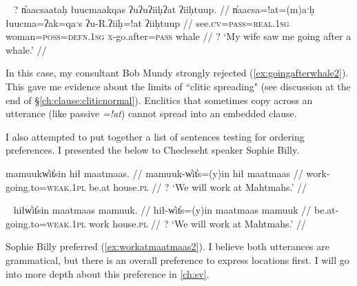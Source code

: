 \ex~ \label{ex:goingafterwhale2}
\begingl
\glpreamble ? n̓aacsaataḥ łuucmaakqas ʔuʔuʔiiḥʔat ʔiiḥtuup. //
\gla n̓aacsa=!at=(m)aˑḥ łuucma=ʔak=qaˑs ʔu-R.ʔiiḥ=!at ʔiiḥtuup //
\glb see.\textsc{cv}=\textsc{pass}=\textsc{real.1sg} woman=\textsc{poss}=\textsc{defn.1sg} \textsc{x}-go.after=\textsc{pass} whale //
\glft ? `My wife saw me going after a whale.' //
\endgl
\xe


\begin{comment}
\ex \label{becauseofbaby1}
\begingl
\glpreamble ? ʔuusaaḥimta nay̓aqakʔi wikitaḥ ƛuł weʔič. //
\gla ʔuusaaḥi=(m)it=maˑ nay̓aqak=ʔiˑ wik=(m)it=(m)aˑḥ ƛuł weʔič //
\glb because.of=\textsc{pst}=\textsc{real.3} baby=\textsc{art} \textsc{neg}=\textsc{pst}=\textsc{real.1sg} good sleep //
\glft ? `I didn't sleep well because of the baby.' //
\endgl
\xe

\ex~ \label{becauseofbaby2}
\begingl
\glpreamble ? ʔuusaaḥiqḥita nay̓aqakʔi wikitaḥ ƛuł weʔič. //
\gla ʔuusaaḥi-(q)ḥ=(m)it=maˑ nay̓aqak=ʔiˑ wik=(m)it=(m)aˑḥ ƛuł weʔič //
\glb because.of-\textsc{link}=\textsc{pst}=\textsc{real.3} baby=\textsc{art} \textsc{neg}=\textsc{pst}=\textsc{real.1sg} good sleep //
\glft ? `I didn't sleep well because of the baby.' //
\endgl
\xe
\end{comment}

\noindent In this case, my consultant Bob Mundy strongly rejected (\ref{ex:goingafterwhale2}). This gave me evidence about the limits of ``clitic spreading" (see discussion at the end of \S\ref{ch:clause:cliticnormal}). Enclitics that sometimes copy across an utterance (like passive \textit{=!at}) cannot spread into an embedded clause.

I also attempted to put together a list of sentences testing for ordering preferences. I presented the below to Checleseht speaker Sophie Billy.

\ex \label{ex:workatmaatmaas1}
\begingl
\glpreamble mamuukw̓it̓sin hił maatmaas. //
\gla mamuuk-w̓it̓s=(y)in hił maatmaas //
\glb work-going.to=\textsc{weak.1pl} be.at house.\textsc{pl} //
\glft ? `We will work at Mahtmahs.' //
\endgl
\xe

\ex~ \label{ex:workatmaatmaas2}
\begingl
\glpreamble hiłw̓it̓sin maatmaas mamuuk. //
\gla hił-w̓it̓s=(y)in maatmaas mamuuk //
\glb be.at-going.to=\textsc{weak.1pl} work house.\textsc{pl} //
\glft ? `We will work at Mahtmahs.' //
\endgl
\xe

\noindent Sophie Billy preferred (\ref{ex:workatmaatmaas2}). I believe both utterances are grammatical, but there is an overall preference to express locations first. I will go into more depth about this preference in \cref{ch:sv}.

